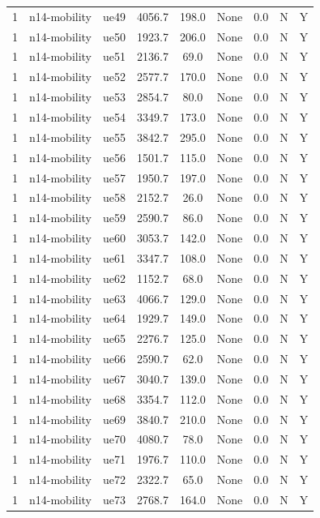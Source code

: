 \begin{table}[ht]
\begin{tabular}{|c|c|c|c|c|c|c|c|c|}
1 & n14-mobility & ue49 & 4056.7 & 198.0 & None & 0.0 & N & Y \\
1 & n14-mobility & ue50 & 1923.7 & 206.0 & None & 0.0 & N & Y \\
1 & n14-mobility & ue51 & 2136.7 & 69.0 & None & 0.0 & N & Y \\
1 & n14-mobility & ue52 & 2577.7 & 170.0 & None & 0.0 & N & Y \\
1 & n14-mobility & ue53 & 2854.7 & 80.0 & None & 0.0 & N & Y \\
1 & n14-mobility & ue54 & 3349.7 & 173.0 & None & 0.0 & N & Y \\
1 & n14-mobility & ue55 & 3842.7 & 295.0 & None & 0.0 & N & Y \\
1 & n14-mobility & ue56 & 1501.7 & 115.0 & None & 0.0 & N & Y \\
1 & n14-mobility & ue57 & 1950.7 & 197.0 & None & 0.0 & N & Y \\
1 & n14-mobility & ue58 & 2152.7 & 26.0 & None & 0.0 & N & Y \\
1 & n14-mobility & ue59 & 2590.7 & 86.0 & None & 0.0 & N & Y \\
1 & n14-mobility & ue60 & 3053.7 & 142.0 & None & 0.0 & N & Y \\
1 & n14-mobility & ue61 & 3347.7 & 108.0 & None & 0.0 & N & Y \\
1 & n14-mobility & ue62 & 1152.7 & 68.0 & None & 0.0 & N & Y \\
1 & n14-mobility & ue63 & 4066.7 & 129.0 & None & 0.0 & N & Y \\
1 & n14-mobility & ue64 & 1929.7 & 149.0 & None & 0.0 & N & Y \\
1 & n14-mobility & ue65 & 2276.7 & 125.0 & None & 0.0 & N & Y \\
1 & n14-mobility & ue66 & 2590.7 & 62.0 & None & 0.0 & N & Y \\
1 & n14-mobility & ue67 & 3040.7 & 139.0 & None & 0.0 & N & Y \\
1 & n14-mobility & ue68 & 3354.7 & 112.0 & None & 0.0 & N & Y \\
1 & n14-mobility & ue69 & 3840.7 & 210.0 & None & 0.0 & N & Y \\
1 & n14-mobility & ue70 & 4080.7 & 78.0 & None & 0.0 & N & Y \\
1 & n14-mobility & ue71 & 1976.7 & 110.0 & None & 0.0 & N & Y \\
1 & n14-mobility & ue72 & 2322.7 & 65.0 & None & 0.0 & N & Y \\
1 & n14-mobility & ue73 & 2768.7 & 164.0 & None & 0.0 & N & Y \\

\end{tabular}
\end{table}
